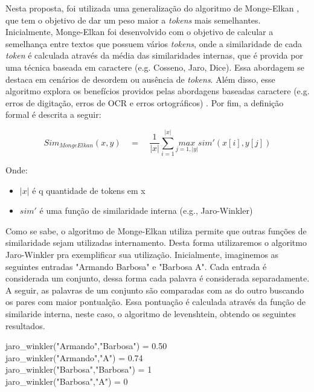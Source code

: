 Nesta proposta, foi utilizada uma generalização do algoritmo de Monge-Elkan \cite{monge1996field}, que tem o objetivo de dar um peso maior a \textit{tokens} mais semelhantes. Inicialmente, Monge-Elkan foi desenvolvido com o objetivo de calcular a semelhança entre textos que possuem vários \textit{tokens}, onde a similaridade de cada \textit{token} é calculada através da média das similaridades internas, que é provida por uma técnica baseada em caractere (e.g. Cosseno, Jaro, Dice). Essa abordagem se destaca em cenários de desordem ou ausência de \textit{tokens}. Além disso, esse algoritmo explora os benefícios providos pelas abordagens baseadas caractere (e.g. erros de digitação, erros de OCR e erros ortográficos) \cite{jimenez2009generalized}. Por fim, a definição formal é descrita a seguir:

\begin{equation}
{ Sim }_{ MongeElkan }(x,y)\quad =\quad \frac { 1 }{ \left| x \right|  } \sum _{ i=1 }^{ \left| x \right|  }{ \underset { j=1,\left| y \right|  }{ max }  } sim'(x\left[ i \right] ,y\left[ j \right] )
\end{equation}

Onde:
\begin{itemize}
	\item $\left| x \right|$ é q quantidade de tokens em x
	\item $sim'$ é uma função de similaridade interna (e.g., Jaro-Winkler)
\end{itemize}

Como se sabe, o algoritmo de Monge-Elkan utiliza permite que outras funções de similaridade sejam utilizadas internamento. Desta forma utilizaremos o algoritmo Jaro-Winkler pra exemplificar sua utilização. Inicialmente, imaginemos as seguintes entradas "Armando Barbosa" e "Barbosa A". Cada entrada é considerada um conjunto, dessa forma cada palavra é considerada separadamente. A seguir, as palavras de um conjunto são comparadas com as do outro buscando os pares com maior pontualção. Essa pontuação é calculada através da função de similaride interna, neste caso, o algoritmo de levenshtein, obtendo os seguintes resultados.

\noindent
jaro\_winkler("Armando","Barbosa") = 0.50\\
jaro\_winkler("Armando","A") = 0.74\\
jaro\_winkler("Barbosa","Barbosa") = 1\\
jaro\_winkler("Barbosa","A") = 0\\

